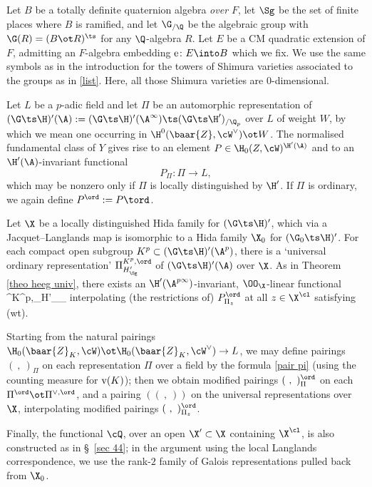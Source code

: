  Let $B$ be a totally definite quaternion algebra \emph{over $F$}, let  $\Sg$ be the set of finite places where $B$ is ramified, and let $\G_{/\Q}$ be the algebraic group with $\G(R)=(B\ot R)^{\ts}$ for any $\Q$-algebra $R$. Let $E$ be a CM quadratic extension of $F$, admitting an $F$-algebra embedding ${\rm e}\colon E\into B$  which we fix. We use the same symbols as in the introduction for the towers of Shimura varieties associated to the groups as in \eqref{list}.  Here, all those Shimura varieties  are $0$-dimensional.

 Let $L$ be a $p$-adic field and let $\Pi$ be an automorphic representation of $(\G\ts\H)'(\A):=(\G\ts\H)'(\A^{\infty})\ts (\G\ts\H')_{/\Q_{p}}$ over $L$ of weight $W$, by which we mean one occurring in $\H^{0}(\baar{Z}, \cW^{\vee})\ot W$. The normalised  fundamental class of $Y$ gives rise to an element $P\in \H_{0}(Z, \cW)^{\H'(\A)}$ and to an  $\H'(\A)$-invariant functional
 $$P_{\Pi}\colon \Pi\to L, $$
 which may be nonzero only if $\Pi$ is locally distinguished by $\H'$. If $\Pi$ is ordinary, we again define $P^{\ord}:= P\tord$.


 Let $\X$ be a locally distinguished  Hida family for $(\G\ts \H)'$, which via a Jacquet--Langlands  map is isomorphic to  a Hida family $\X_{0}$ for $(\G_{0}\ts\H)'$. For each compact open subgroup $K^{p}\subset (\G\ts\H)'(\A^{p})$, there is a `universal ordinary representation' $\Pi^{K^{p},\ord}_{H'_{\Sg}}$ of $(\G\ts\H)'(\A)$ over $\X$. As in Theorem \ref{theo heeg univ}, there exists an $\H'(\A^{p\infty})$-invariant, $\OO_{\X}$-linear functional
\beq{} \cP\colon  \Pi^{K^{p},\ord}_{H'_{\Sg}}\to \OO_{\X} \eeq
 interpolating (the restrictions of) $P_{\Pi_{z}}^{\ord}$ at all $z\in \X^{\cl}$ satisfying (wt).

Starting from the natural pairings $\H_{0} (\baar{Z}_{K} , \cW)\ot \H_{0} (\baar{Z}_{K} ,\cW^{\vee})\to L$, we may define pairings $(\ , \ )_{\Pi}$ on each  representation $\Pi$ over a field  by the formula  \eqref{pair pi} (using the counting measure for ${\rm v}(K)$);   then we obtain modified pairings $(\ , \ )^{\ord}_{\Pi}$ on each $\Pi^{\ord}\ot \Pi^{\vee, \ord}$, and a  pairing $((\ ,  \ ))$ on the universal representations over $\X$, interpolating modified pairings  $(\ , \ )^{\ord}_{\Pi_{z}}$.

Finally, the functional $\cQ$, over an open $\X'\subset \X$ containing $\X^{\cl}$,  is also constructed as  in  \S~\ref{sec 44}; in the argument using the local Langlands correspondence, we use the rank-$2$ family of Galois representations pulled back from $\X_{0}$.

